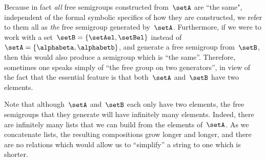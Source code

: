 Because in fact \emph{all} free semigroups constructed from~$\setA$ are ``the same", independent of the formal symbolic specifics of how they are constructed, we refer to them all as \emph{the} free semigroup generated by~$\setA$.
Furthermore, if we were to work with a set~$\setB = \{ \setAel, \setBel \}$ instead of~$\setA = \{ \alphabeta, \alphabetb\}$, and generate a free semigroup from~$\setB$, then this would also produce a semigroup which is ``the same''.
Therefore, sometimes one speaks simply of ``the free group on two generators'', in view of the fact that the essential feature is that both~$\setA$ and~$\setB$ have two elements.

Note that although~$\setA$ and~$\setB$ each only have two elements, the free semigroups that they generate will have infinitely many elements.
Indeed, there are infinitely many lists that we can build from the elements of~$\setA$.
As we concatenate lists, the resulting compositions grow longer and longer, and there are no relations which would allow us to ``simplify'' a string to one which is shorter.

